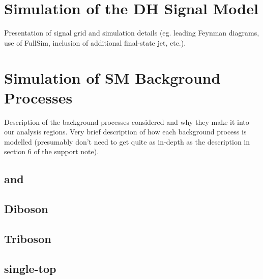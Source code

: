 \section{Simulation of the DH Signal Model}

Presentation of signal grid and simulation details (eg. leading Feynman diagrams, use of FullSim, inclusion of additional final-state jet, etc.).

\section{Simulation of SM Background Processes}

Description of the background processes considered and why they make it into our analysis regions. Very brief description of how each background process is modelled (presumably don't need to get quite as in-depth as the description in section 6 of the support note). 

\subsection{\wjets and \zjets}

\subsection{\ttbar}

\subsection{Diboson}

\subsection{Triboson}

\subsection{single-top}

